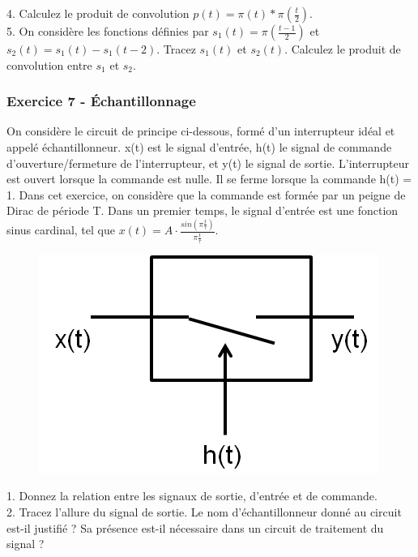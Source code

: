 	4. Calculez le produit de convolution $p(t)=\pi(t)*\pi(\frac{t}{2})$.\\
	
	5. On considère les fonctions définies par $s_{1}(t)=\pi(\frac{t-1}{2})$ et $s_{2}(t)=s_{1}(t)-s_{1}(t-2)$. Tracez $s_{1}(t)$ et $s_{2}(t)$. Calculez le produit de convolution entre $s_{1}$ et $s_{2}$.
	
	\vspace{1\baselineskip}
	
	\subsubsection{Exercice 7 - Échantillonnage}
	
		On considère le circuit de principe ci-dessous, formé d'un interrupteur idéal et appelé échantillonneur. x(t) est le signal d'entrée, h(t) le signal de commande d'ouverture/fermeture de l'interrupteur, et y(t) le signal de sortie. L'interrupteur est ouvert lorsque la commande est nulle. Il se ferme lorsque la commande h(t) = 1.
	Dans cet exercice, on considère que la commande est formée par un peigne de Dirac de période T. Dans un premier temps, le signal d'entrée est une fonction sinus cardinal, tel que $x(t)=A\cdot \frac{sin(\pi \frac{t}{\tau})}{\pi \frac{t}{\tau}}$.
	
	\begin{figure}[h!]
		\centering
		\includegraphics[scale=0.6]{images/Echantillonneur.png} 
	\end{figure}
	
	
	1. Donnez la relation entre les signaux de sortie, d'entrée et de commande.\\
	
	2. Tracez l'allure du signal de sortie. Le nom d'échantillonneur donné au circuit est-il justifié ? Sa présence est-il nécessaire dans un circuit de traitement du signal ?\\
	
